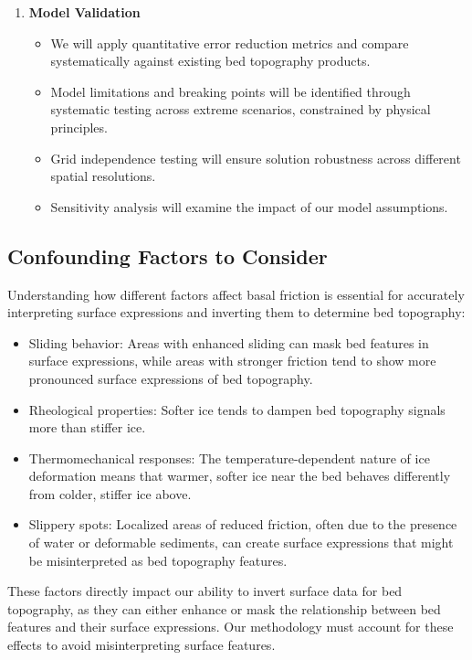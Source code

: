 \begin{enumerate}
\item\textbf{Model Validation}
    \begin{itemize}
    \item We will apply quantitative error reduction metrics and compare systematically against existing bed topography products.
    
    \item Model limitations and breaking points will be identified through systematic testing across extreme scenarios, constrained by physical principles.
    
    \item Grid independence testing will ensure solution robustness across different spatial resolutions.
    
    \item Sensitivity analysis will examine the impact of our model assumptions.
    \end{itemize}
\end{enumerate}


\subsection*{Confounding Factors to Consider}
Understanding how different factors affect basal friction is essential for accurately interpreting surface expressions and inverting them to determine bed topography:

\begin{itemize}
    \item Sliding behavior: Areas with enhanced sliding can mask bed features in surface expressions, while areas with stronger friction tend to show more pronounced surface expressions of bed topography.
    
    \item Rheological properties: Softer ice tends to dampen bed topography signals more than stiffer ice.
    
    \item Thermomechanical responses: The temperature-dependent nature of ice deformation means that warmer, softer ice near the bed behaves differently from colder, stiffer ice above.
    
    \item Slippery spots: Localized areas of reduced friction, often due to the presence of water or deformable sediments, can create surface expressions that might be misinterpreted as bed topography features.
\end{itemize}

These factors directly impact our ability to invert surface data for bed topography, as they can either enhance or mask the relationship between bed features and their surface expressions. Our methodology must account for these effects to avoid misinterpreting surface features.

